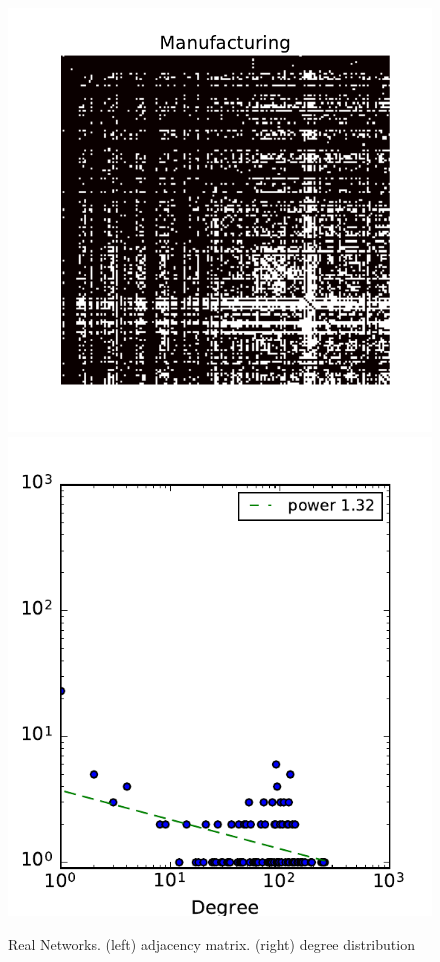 \begin{figure}[h]
	\endminipage
	\vspace{-0.4cm}
	\includegraphics[scale=0.4]{img/manufacturing}
	\endminipage
	\includegraphics[scale=0.4]{img/manufacturing_d}
	\endminipage
	\caption{Real Networks. (left) adjacency matrix. (right) degree distribution}
	\label{fig:real_graph}
\end{figure}



